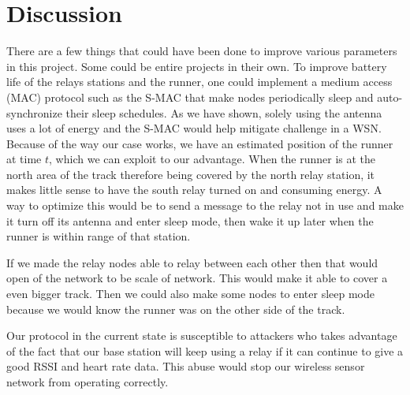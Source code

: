\chapter{Discussion}

There are a few things that could have been done to improve various parameters in this project. Some could be entire projects in their own. To improve battery life of the relays stations and the runner, one could implement a medium access (MAC) protocol such as the S-MAC that make nodes periodically sleep and auto-synchronize their sleep schedules. As we have shown, solely using the antenna uses a lot of energy and the S-MAC would help mitigate challenge in a WSN. Because of the way our case works, we have an estimated position of the runner at time $t$, which we can exploit to our advantage. When the runner is at the north area of the track therefore being covered by the north relay station, it makes little sense to have the south relay turned on and consuming energy. A way to optimize this would be to send a message to the relay not in use and make it turn off its antenna and enter sleep mode, then wake it up later when the runner is within range of that station.

\noindent If we made the relay nodes able to relay between each other then that would open of the network to be scale of network. This would make it able to cover a even bigger track. Then we could also make some nodes to enter sleep mode because we would know the runner was on the other side of the track.

\noindent Our protocol in the current state is susceptible to attackers who takes advantage of the fact that our base station will keep using a relay if it can continue to give a good RSSI and heart rate data. This abuse would stop our wireless sensor network from operating correctly.